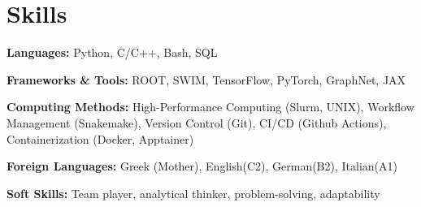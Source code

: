 \documentclass[letterpaper,11pt]{article}
\begin{document}
\section{Skills}
  \vspace{2pt}
  \resumeSubHeadingListStart
    \small{\item{
        
        \textbf{Languages:}{ Python, C/C++, Bash, SQL} \\ \vspace{3pt}

        \textbf{Frameworks \& Tools:}{ ROOT, SWIM, TensorFlow, PyTorch, GraphNet, JAX} 
        
        \textbf{Computing Methods:}{ High-Performance Computing (Slurm, UNIX), Workflow Management (Snakemake), Version Control (Git), CI/CD (Github Actions), Containerization (Docker, Apptainer)} \\ \vspace{3pt}
        


        \textbf{Foreign Languages:} {Greek (Mother), English(C2), German(B2), Italian(A1)} \\ \vspace{3pt}

        \textbf{Soft Skills:}{ Team player, analytical thinker, problem-solving, adaptability} \\ \vspace{3pt}
    }}
  \resumeSubHeadingListEnd




      
      
\end{document}
